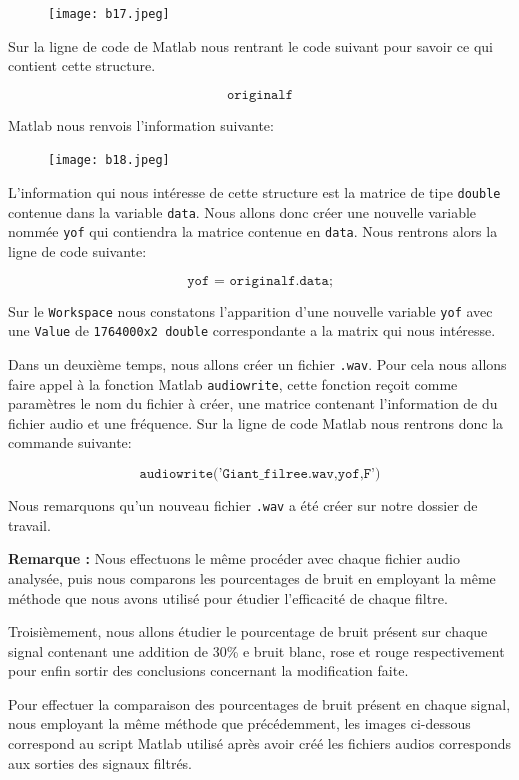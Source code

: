 \documentclass[conference,onecolumn]{IEEEtran}
\begin{document}
 \begin{figure}[H]
 \centering
    \texttt{[image: b17.jpeg]}
\end{figure}


Sur la ligne de code de Matlab nous rentrant le code suivant pour savoir ce qui contient cette structure.

\[\texttt{originalf}\]

Matlab nous renvois l'information suivante:

 \begin{figure}[H]
 \centering
    \texttt{[image: b18.jpeg]}
\end{figure}


L'information qui nous intéresse de cette structure est la matrice de tipe \texttt{double} contenue dans la variable \texttt{data}. Nous allons donc créer une nouvelle variable nommée \texttt{yof} qui contiendra la matrice contenue en \texttt{data}. Nous rentrons alors la ligne de code suivante:

\[\texttt{yof = originalf.data;}\]

Sur le \texttt{Workspace} nous constatons l'apparition d'une nouvelle variable \texttt{yof} avec une \texttt{Value} de \texttt{1764000x2 double} correspondante a la matrix qui nous intéresse.

Dans un deuxième temps, nous allons créer un fichier \texttt{.wav}. Pour cela nous allons faire appel à la fonction Matlab \texttt{audiowrite}, cette fonction reçoit comme paramètres le nom du fichier à créer, une matrice contenant l'information de du fichier audio et une fréquence. Sur la ligne de code Matlab nous rentrons donc la commande suivante:

\[\texttt{audiowrite('Giant\_filree.wav,yof,F')}\]

Nous remarquons qu'un nouveau fichier \texttt{.wav} a été créer sur notre dossier de travail. 

\textbf{Remarque :} Nous effectuons le même procéder avec chaque fichier audio analysée, puis nous comparons les pourcentages de bruit en employant la même méthode que nous avons utilisé pour étudier l'efficacité de chaque filtre. 

Troisièmement, nous allons étudier le pourcentage de bruit présent sur chaque signal contenant une addition de 30\% e bruit blanc, rose et rouge respectivement pour enfin sortir des conclusions concernant la modification faite. 

Pour effectuer la comparaison des pourcentages de bruit présent en chaque signal, nous employant la même méthode que précédemment, les images ci-dessous correspond au script Matlab utilisé après avoir créé les fichiers audios corresponds aux sorties des signaux filtrés. 
\end{document}
